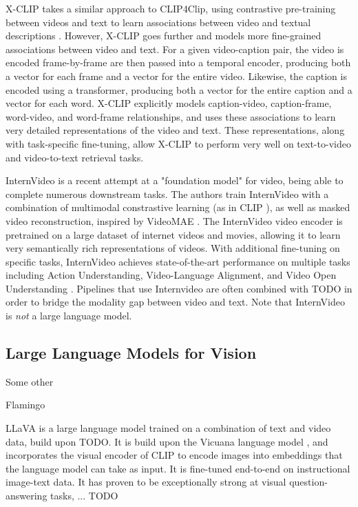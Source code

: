 \documentclass{article}
\begin{document}
X-CLIP takes a similar approach to CLIP4Clip, using contrastive pre-training between videos and text to learn associations between video and textual descriptions \cite{xclip}.
However, X-CLIP goes further and models more fine-grained associations between video and text.
For a given video-caption pair, the video is encoded frame-by-frame are then passed into a temporal encoder, producing both a vector for each frame and a vector for the entire video.
Likewise, the caption is encoded using a transformer, producing both a vector for the entire caption and a vector for each word.
X-CLIP explicitly models caption-video, caption-frame, word-video, and word-frame relationships, and uses these associations to learn very detailed representations of the video and text.
These representations, along with task-specific fine-tuning, allow X-CLIP to perform very well on text-to-video and video-to-text retrieval tasks.

InternVideo is a recent attempt at a "foundation model" for video, being able to complete numerous downstream tasks.
The authors train InternVideo with a combination of multimodal constrastive learning (as in CLIP \cite{clip}), as well as masked video reconstruction, inspired by VideoMAE \cite{videomae}.
The InternVideo video encoder is pretrained on a large dataset of internet videos and movies, allowing it to learn very semantically rich representations of videos.
With additional fine-tuning on specific tasks, InternVideo achieves state-of-the-art performance on multiple tasks including Action Understanding, Video-Language Alignment, and Video Open Understanding \cite{internvideo}.
Pipelines that use Internvideo are often combined with TODO in order to bridge the modality gap between video and text. Note that InternVideo is \textit{not} a large language model.

\subsection{Large Language Models for Vision}

Some other 

Flamingo

LLaVA \cite{llava} is a large language model trained on a combination of text and video data, build upon TODO. 
It is build upon the Vicuana language model \cite{vicuana}, and incorporates the visual encoder of CLIP \cite{clip} to encode images into embeddings that the language model can take as input.
It is fine-tuned end-to-end on instructional image-text data.
It has proven to be exceptionally strong at visual question-answering tasks, ... TODO
\end{document}

